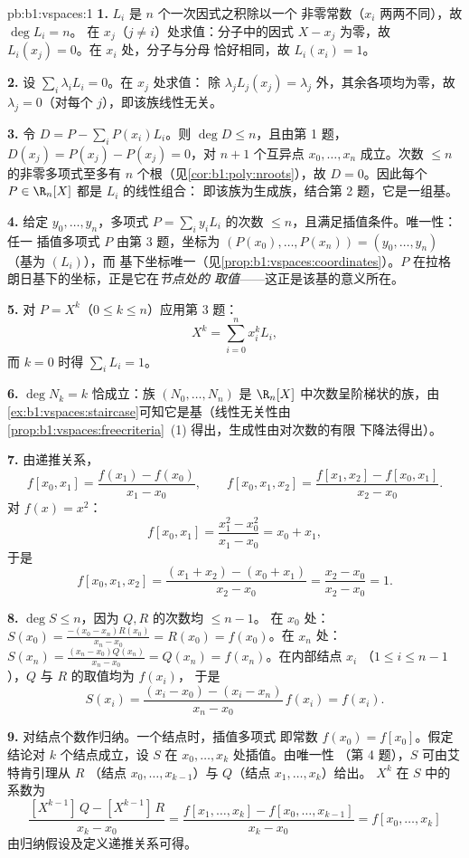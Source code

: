 \begin{solution}{pb:b1:vspaces:1}
\textbf{1.} $L_i$ 是 $n$ 个一次因式之积除以一个
非零常数（$x_i$ 两两不同），故 $\deg L_i = n$。
在 $x_j$（$j \neq i$）处求值：分子中的因式 $X - x_j$
为零，故 $L_i(x_j) = 0$。在 $x_i$ 处，分子与分母
恰好相同，故 $L_i(x_i) = 1$。

\textbf{2.} 设 $\sum_i \lambda_i L_i = 0$。在 $x_j$ 处求值：
除 $\lambda_j L_j(x_j) = \lambda_j$ 外，其余各项均为零，故
$\lambda_j = 0$（对每个 $j$），即该族线性无关。

\textbf{3.} 令 $D = P - \sum_i P(x_i) L_i$。则 $\deg D \leq n$，且由第 1 题，
$D(x_j) = P(x_j) - P(x_j) = 0$，对 $n + 1$
个互异点 $x_0, \dots, x_n$ 成立。次数
$\leq n$ 的非零多项式至多有 $n$ 个根（见\cref{cor:b1:poly:nroots}），故 $D
= 0$。因此每个 $P \in \R_n[X]$ 都是 $L_i$ 的线性组合：
即该族为生成族，结合第 2 题，它是一组基。

\textbf{4.} 给定 $y_0, \dots, y_n$，多项式 $P = \sum_i
y_i L_i$ 的次数 $\leq n$，且满足插值条件。唯一性：任一
插值多项式 $P$ 由第 3 题，坐标为 $(P(x_0), \dots,
P(x_n)) = (y_0, \dots, y_n)$（基为 $(L_i)$），而
基下坐标唯一（见\cref{prop:b1:vspaces:coordinates}）。$P$
在拉格朗日基下的坐标，正是它在\emph{节点处的
取值}——这正是该基的意义所在。

\textbf{5.} 对 $P = X^k$（$0 \leq k \leq n$）应用第 3 题：
\[
X^k = \sum_{i=0}^{n} x_i^{k} L_i ,
\]
而 $k = 0$ 时得 $\sum_i L_i = 1$。

\textbf{6.} $\deg N_k = k$ 恰成立：族 $(N_0, \dots, N_n)$
是 $\R_n[X]$ 中次数呈阶梯状的族，由
\cref{ex:b1:vspaces:staircase}可知它是基（线性无关性由
\cref{prop:b1:vspaces:freecriteria}~(1) 得出，生成性由对次数的有限
下降法得出）。

\textbf{7.} 由递推关系，
\[
f[x_0, x_1] = \frac{f(x_1) - f(x_0)}{x_1 - x_0},
\qquad
f[x_0, x_1, x_2] = \frac{f[x_1, x_2] - f[x_0, x_1]}{x_2 - x_0}.
\]
对 $f(x) = x^2$：
\[
f[x_0, x_1] = \frac{x_1^2 - x_0^2}{x_1 - x_0} = x_0 + x_1,
\]
于是
\[
f[x_0, x_1, x_2]
= \frac{(x_1 + x_2) - (x_0 + x_1)}{x_2 - x_0}
= \frac{x_2 - x_0}{x_2 - x_0} = 1 .
\]

\textbf{8.} $\deg S \leq n$，因为 $Q, R$ 的次数均 $\leq n - 1$。
在 $x_0$ 处：$S(x_0) = \frac{-(x_0 - x_n) R(x_0)}{x_n - x_0} =
R(x_0) = f(x_0)$。在 $x_n$ 处：$S(x_n) = \frac{(x_n - x_0)
Q(x_n)}{x_n - x_0} = Q(x_n) = f(x_n)$。在内部结点 $x_i$
（$1 \leq i \leq n-1$），$Q$ 与 $R$ 的取值均为 $f(x_i)$，
于是
\[
S(x_i) = \frac{(x_i - x_0) - (x_i - x_n)}{x_n - x_0}\, f(x_i)
= f(x_i) .
\]

\textbf{9.} 对结点个数作归纳。一个结点时，插值多项式
即常数 $f(x_0) = f[x_0]$。假定结论对
$k$ 个结点成立，设 $S$ 在 $x_0, \dots, x_k$ 处插值。由唯一性
（第 4 题），$S$ 可由艾特肯引理从 $R$
（结点 $x_0, \dots, x_{k-1}$）与 $Q$（结点 $x_1, \dots, x_k$）给出。
$X^{k}$ 在 $S$ 中的系数为
\[
\frac{[X^{k-1}]\,Q - [X^{k-1}]\,R}{x_k - x_0}
= \frac{f[x_1, \dots, x_k] - f[x_0, \dots, x_{k-1}]}{x_k - x_0}
= f[x_0, \dots, x_k]
\]
由归纳假设及定义递推关系可得。


\end{solution}
